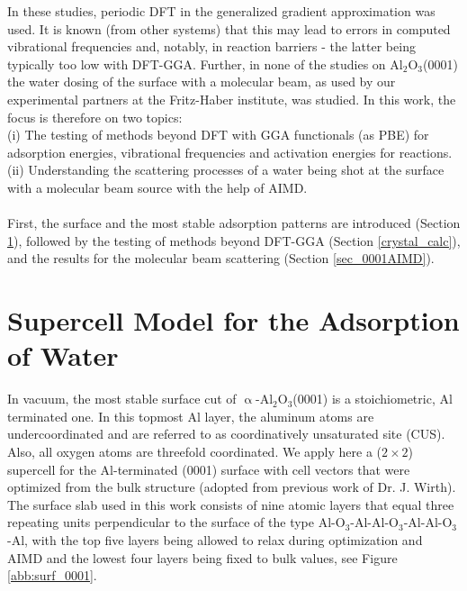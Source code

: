 \documentclass[11pt,DIV=13,BCOR=5mm,a4paper,headinclude]{scrbook}
\newcommand\todo[1]{\textcolor{red}{TODO: \textit{{#1}}}}
\begin{document}
In these studies, periodic DFT in the generalized gradient approximation was used.
It is known (from other systems) that this may lead to errors in computed vibrational frequencies and, notably, in reaction barriers - the latter being typically too low with DFT-GGA.
Further, in none of the studies on Al$_2$O$_3$(0001) the water dosing of the surface with a molecular beam, as used by our experimental partners at the Fritz-Haber institute, was studied.
In this work, the focus is therefore on two topics:
\\
(i) The testing of methods beyond DFT with GGA functionals (as PBE) for adsorption energies, vibrational frequencies and activation energies for reactions.
\\
(ii) Understanding the scattering processes of a water being shot at the surface with a molecular beam source with the help of AIMD.
\\\\
First, the surface and the most stable adsorption patterns are introduced (Section \ref{sec_0001surf}), followed by the testing of methods beyond DFT-GGA (Section \ref{crystal_calc}), and the results for the molecular beam scattering\cite{Heiden0001_2018} (Section \ref{sec_0001AIMD}).
	
\section{Supercell Model for the Adsorption of Water}\label{sec_0001surf}

In vacuum, the most stable surface cut of $\upalpha$-Al$_2$O$_3$(0001) is a stoichiometric, Al terminated one.
In this topmost Al layer, the aluminum atoms are undercoordinated and are referred to as coordinatively unsaturated site (CUS).
Also, all oxygen atoms are threefold coordinated. %
We apply here a ($2\times 2$) supercell for the Al-terminated (0001) surface with cell vectors that were optimized from the bulk structure (adopted from previous work of Dr. J. Wirth\cite{WirthJPCC2012}).
The surface slab used in this work consists of nine atomic layers that equal three repeating units perpendicular to the surface of the type Al-O$_3$-Al-Al-O$_3$-Al-Al-O$_3$-Al, with the top five layers being allowed to relax during optimization and AIMD and the lowest four layers being fixed to bulk values, see Figure \ref{abb:surf_0001}.
\end{document}
